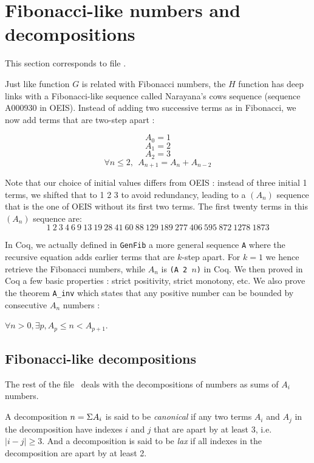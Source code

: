 \documentclass[a4paper,11pt]{article}
\begin{document}
\section{Fibonacci-like numbers and decompositions}

This section corresponds to file .

Just like function $G$ is related with Fibonacci numbers,
the $H$ function has deep links with a Fibonacci-like sequence
called Narayana's cows sequence (sequence A000930 in OEIS\cite{??}).
Instead of adding two successive terms as in Fibonacci, we now add
terms that are two-step apart :

$$A_0 = 1 $$
$$A_1 = 2 $$
$$A_2 = 3 $$
$$\forall n\le 2,~~ A_{n+1} = A_{n}+A_{n-2}$$

Note that our choice of initial values differs from OEIS : instead of
three initial 1 terms, we shifted that to 1 2 3 to avoid redundancy,
leading to a $(A_n)$ sequence that is the one of OEIS without its
first two terms. The first twenty terms in this $(A_n)$ sequence are:
%
$$ 1 ~ 2 ~ 3 ~ 4 ~ 6 ~ 9 ~ 13 ~ 19 ~ 28 ~ 41 ~ 60 ~ 88 ~ 129 ~ 189 ~
277 ~ 406 ~ 595 ~ 872 ~ 1278 ~ 1873 $$

In Coq, we actually defined in {\tt GenFib} a more general sequence {\tt A}
where the recursive equation adds earlier terms that are $k$-step apart.
For $k=1$ we hence retrieve the Fibonacci numbers, while $A_n$ is {\tt (A 2
  $n$)} in Coq. We then proved in Coq a few basic properties :
strict positivity, strict monotony, etc.
We also prove the theorem {\tt A\_inv} which states
that any positive number can be bounded by
consecutive $A_n$ numbers :

\begin{theorem}\label{fibinv}
$\forall n>0, \exists p, A_p \le n < A_{p+1}$.
\end{theorem}

\subsection{Fibonacci-like decompositions} The rest of the file \
deals with the decompositions of numbers as sums of $A_i$
numbers.
\begin{definition}
 A decomposition $n = \Sigma A_i$ is said to be \emph{canonical} if
 any two terms $A_i$ and $A_j$ in the decomposition have indexes $i$
 and $j$ that are apart by at least 3, i.e. $|i-j|\ge 3$.
 And a decomposition is said to be \emph{lax} if all indexes in the
 decomposition are apart by at least 2.
\end{definition}
\end{document}
